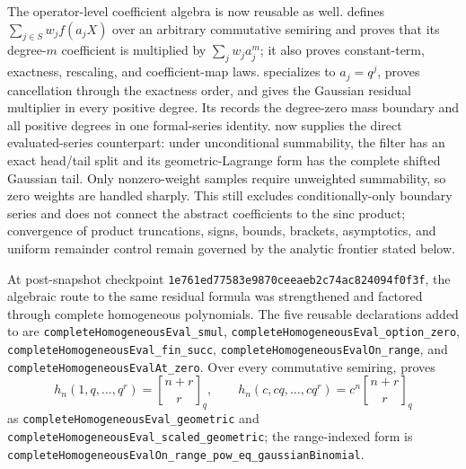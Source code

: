\documentclass[11pt]{article}
\numberwithin{equation}{section}
\theoremstyle{definition}
\theoremstyle{remark}
\newcommand{\qbinom}[3]{\genfrac{[}{]}{0pt}{}{#1}{#2}_{#3}}
\begin{document}
The operator-level coefficient algebra is now reusable as well.
 defines
\(\sum_{j\in S}w_j f(a_jX)\) over an arbitrary commutative semiring and
proves that its degree-\(m\) coefficient is multiplied by
\(\sum_jw_ja_j^m\); it also proves constant-term, exactness, rescaling, and
coefficient-map laws.   specializes
to \(a_j=q^j\), proves cancellation through the exactness order, and gives
the Gaussian residual multiplier in every positive degree.  Its
 records the degree-zero
mass boundary and all positive degrees in one formal-series identity.
 now supplies the direct evaluated-series
counterpart: under unconditional summability, the filter has an exact head/tail
split and its geometric-Lagrange form has the complete shifted Gaussian tail.
Only nonzero-weight samples require unweighted summability, so zero weights are
handled sharply.  This still excludes conditionally-only boundary series and
does not connect the abstract coefficients to the sinc product; convergence of
product truncations, signs, bounds, brackets, asymptotics, and uniform remainder
control remain governed by the analytic frontier stated below.

At post-snapshot checkpoint
\nolinkurl{1e761ed77583e9870ceeaeb2c74ac824094f0f3f}, the algebraic route to the
same residual formula was strengthened and factored through complete
homogeneous polynomials.  The five reusable declarations added to
 are
\nolinkurl{completeHomogeneousEval_smul},
\nolinkurl{completeHomogeneousEval_option_zero},
\nolinkurl{completeHomogeneousEval_fin_succ},
\nolinkurl{completeHomogeneousEvalOn_range}, and
\nolinkurl{completeHomogeneousEvalAt_zero}.  Over every commutative semiring,
 proves
\[
 h_n(1,q,\ldots,q^r)=\qbinom{n+r}{r}{q},
 \qquad
 h_n(c,cq,\ldots,cq^r)=c^n\qbinom{n+r}{r}{q}
\]
as \nolinkurl{completeHomogeneousEval_geometric} and
\nolinkurl{completeHomogeneousEval_scaled_geometric}; the range-indexed form
is
\nolinkurl{completeHomogeneousEvalOn_range_pow_eq_gaussianBinomial}.
\end{document}
